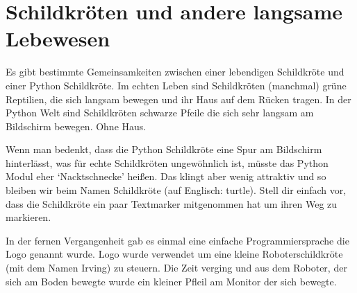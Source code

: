 

\chapter{Schildkröten und andere langsame Lebewesen}\label{ch:turtles}

Es gibt bestimmte Gemeinsamkeiten zwischen einer lebendigen Schildkröte und einer Python Schildkröte. Im echten Leben sind Schildkröten (manchmal) grüne Reptilien, die sich langsam bewegen und ihr Haus auf dem Rücken tragen. In der Python Welt sind Schildkröten schwarze Pfeile die sich sehr langsam am Bildschirm bewegen. Ohne Haus.

Wenn man bedenkt, dass die Python Schildkröte eine Spur am Bildschirm hinterlässt, was für echte Schildkröten ungewöhnlich ist, müsste das Python Modul eher `Nacktschnecke' heißen. Das klingt aber wenig attraktiv und so bleiben wir beim Namen Schildkröte (auf Englisch: turtle). Stell dir einfach vor, dass die Schildkröte ein paar Textmarker mitgenommen hat um ihren Weg zu markieren.

In der fernen Vergangenheit gab es einmal eine einfache Programmiersprache die Logo genannt wurde. Logo wurde verwendet um eine kleine Roboterschildkröte (mit dem Namen Irving) zu steuern. Die Zeit verging und aus dem Roboter, der sich am Boden bewegte wurde ein kleiner Pfleil am Monitor der sich bewegte.

